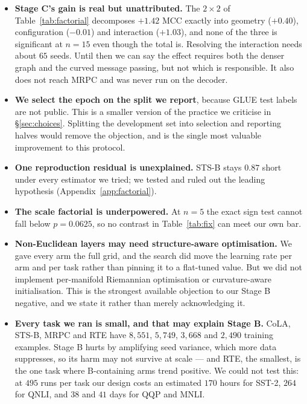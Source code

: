 \documentclass{article}
\begin{document}
\begin{itemize}
\itemsep1pt
\item \textbf{Stage C's gain is real but unattributed.} The $2\times2$ of
      Table~\ref{tab:factorial} decomposes $+1.42$ MCC exactly into geometry
      ($+0.40$), configuration ($-0.01$) and interaction ($+1.03$), and none of
      the three is significant at $n=15$ even though the total is. Resolving the
      interaction needs about $65$ seeds. Until then we can say the effect
      requires both the denser graph and the curved message passing, but not
      which is responsible. It also does not reach MRPC and was never run on the
      decoder.
\item \textbf{We select the epoch on the split we report}, because GLUE test
      labels are not public. This is a smaller version of the practice we
      criticise in \S\ref{sec:choices}. Splitting the development set into
      selection and reporting halves would remove the objection, and is the
      single most valuable improvement to this protocol.
\item \textbf{One reproduction residual is unexplained.} STS-B stays $0.87$
      short under every estimator we tried; we tested and ruled out the leading
      hypothesis (Appendix~\ref{app:factorial}).
\item \textbf{The scale factorial is underpowered.} At $n=5$ the exact sign test
      cannot fall below $p = 0.0625$, so no contrast in Table~\ref{tab:fix} can
      meet our own bar.
\item \textbf{Non-Euclidean layers may need structure-aware optimisation.} We
      gave every arm the full grid, and the search did move the learning rate
      per arm and per task rather than pinning it to a flat-tuned value. But we
      did not implement per-manifold Riemannian optimisation or curvature-aware
      initialisation. This is the strongest available objection to our Stage B
      negative, and we state it rather than merely acknowledging it.
\item \textbf{Every task we ran is small, and that may explain Stage B.} CoLA,
      STS-B, MRPC and RTE have $8{,}551$, $5{,}749$, $3{,}668$ and $2{,}490$
      training examples. Stage B hurts by amplifying seed variance, which more
      data suppresses, so its harm may not survive at scale --- and RTE, the
      smallest, is the one task where B-containing arms trend positive. We could
      not test this: at $495$ runs per task our design costs an estimated $170$
      hours for SST-2, $264$ for QNLI, and $38$ and $41$ days for QQP and MNLI.

\end{itemize}
\end{document}

